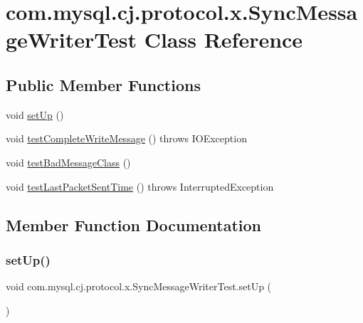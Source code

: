 \hypertarget{classcom_1_1mysql_1_1cj_1_1protocol_1_1x_1_1_sync_message_writer_test}{}\section{com.\+mysql.\+cj.\+protocol.\+x.\+Sync\+Message\+Writer\+Test Class Reference}
\label{classcom_1_1mysql_1_1cj_1_1protocol_1_1x_1_1_sync_message_writer_test}
\subsection*{Public Member Functions}
\begin{DoxyCompactItemize}
\item 
void \mbox{\hyperlink{classcom_1_1mysql_1_1cj_1_1protocol_1_1x_1_1_sync_message_writer_test_a001c1ad2ec3d7f04da2c59a5943e5a47}{set\+Up}} ()
\item 
void \mbox{\hyperlink{classcom_1_1mysql_1_1cj_1_1protocol_1_1x_1_1_sync_message_writer_test_a7aaa9068fcf93ad8d5803c540e475e24}{test\+Complete\+Write\+Message}} ()  throws I\+O\+Exception 
\item 
void \mbox{\hyperlink{classcom_1_1mysql_1_1cj_1_1protocol_1_1x_1_1_sync_message_writer_test_ac1d9da94da97bb96aeb1d2ba37a49724}{test\+Bad\+Message\+Class}} ()
\item 
void \mbox{\hyperlink{classcom_1_1mysql_1_1cj_1_1protocol_1_1x_1_1_sync_message_writer_test_aebc9123f8eeb266d9db25750787c97b2}{test\+Last\+Packet\+Sent\+Time}} ()  throws Interrupted\+Exception 
\end{DoxyCompactItemize}


\subsection{Member Function Documentation}
\mbox{\label{classcom_1_1mysql_1_1cj_1_1protocol_1_1x_1_1_sync_message_writer_test_a001c1ad2ec3d7f04da2c59a5943e5a47}} 
\subsubsection{\texorpdfstring{set\+Up()}{setUp()}}
{\footnotesize\ttfamily void com.\+mysql.\+cj.\+protocol.\+x.\+Sync\+Message\+Writer\+Test.\+set\+Up (\begin{DoxyParamCaption}{ }\end{DoxyParamCaption})}

